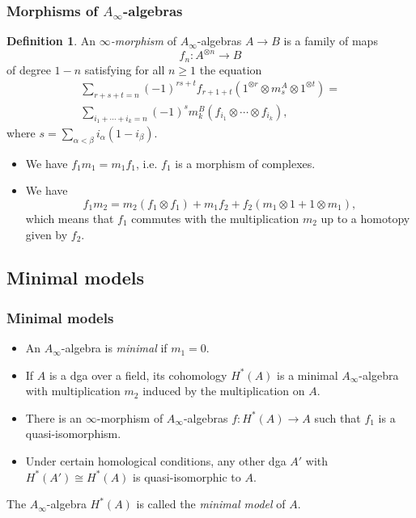 \documentclass{beamer}
\theoremstyle{definition}
\newtheorem{defi}{Definition}
\begin{document}
\begin{frame}
\frametitle{Morphisms of $A_\infty$-algebras}
\begin{defi}
An \emph{$\infty$-morphism} of $A_\infty$-algebras $A\to B$ is a family of maps \[f_n:A^{\otimes n}\to B\] of degree $1-n$ satisfying for all $n\geq 1$ the equation
\begin{align*}
\sum_{r+s+t=n} (-1)^{rs+t}f_{r+1+t}(1^{\otimes r} \otimes m^A_s\otimes 1^{\otimes t})=\\
\sum_{i_1+\cdots+i_k=n} (-1)^s m^B_k(f_{i_1}\otimes\cdots\otimes f_{i_k}),
\end{align*}
where
$s=\sum_{\alpha<\beta}i_\alpha(1-i_\beta)$.%
%
\end{defi}

\end{frame}
\begin{frame}
\begin{itemize}
\item<1-> We have $f_1m_1 = m_1f_1$, i.e. $f_1$ is a morphism of complexes.
\item<2-> We have
\[
f_1m_2 = m_2 (f_1\otimes f_1) + m_1f_2 + f_2 (m_1\otimes 1 + 1\otimes m_1),\]
which means that $f_1$ commutes with the multiplication $m_2$ up to a homotopy
given by $f_2$.
\end{itemize}
\end{frame}

\subsection{Minimal models}
\begin{frame}
\frametitle{Minimal models}
\begin{itemize}
\item An $A_\infty$-algebra is \emph{minimal} if $m_1 = 0$. 
\end{itemize}\pause
\begin{theorem}[Kadeishvili]
\begin{itemize}
\item If $A$ is a dga over a field, its cohomology $H^*(A)$ is a minimal $A_\infty$-algebra with multiplication $m_2$ induced by the multiplication on $A$.
\item There is an $\infty$-morphism of $A_\infty$-algebras $f:H^*(A)\to A$ such that $f_1$ is a quasi-isomorphism.
\item Under certain homological conditions, any other dga $A'$ with $H^*(A')\cong H^*(A)$ is quasi-isomorphic to $A$. 
\end{itemize}
\end{theorem}\pause
The $A_\infty$-algebra $H^*(A)$ is called the \emph{minimal model} of $A$. %
\end{frame}
\end{document}
